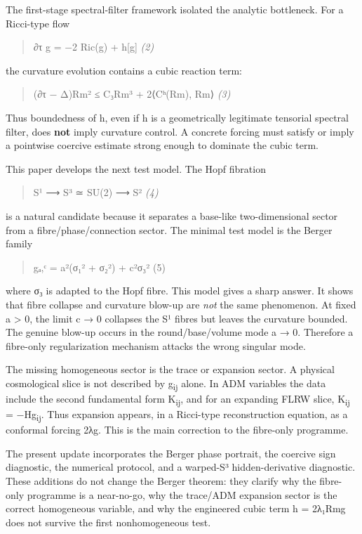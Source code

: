 \documentclass[
]{article}
\begin{document}
The first-stage spectral-filter framework isolated the analytic bottleneck. For a Ricci-type flow

\begin{quote}
∂τ g = −2 Ric(g) + h{[}g{]} \emph{(2)}
\end{quote}

the curvature evolution contains a cubic reaction term:

\begin{quote}
(∂τ − Δ)\textbar Rm\textbar² ≤ C₃\textbar Rm\textbar³ + 2⟨Cʰ(Rm), Rm⟩ \emph{(3)}
\end{quote}

Thus boundedness of h, even if h is a geometrically legitimate tensorial spectral filter, does \textbf{not} imply curvature control. A concrete forcing must satisfy or imply a pointwise coercive estimate strong enough to dominate the cubic term.

This paper develops the next test model. The Hopf fibration

\begin{quote}
S¹ ⟶ S³ ≃ SU(2) ⟶ S² \emph{(4)}
\end{quote}

is a natural candidate because it separates a base-like two-dimensional sector from a fibre/phase/connection sector. The minimal test model is the Berger family

\begin{quote}
gₐ,ᶜ = a²(σ₁² + σ₂²) + c²σ₃² (5)
\end{quote}

where σ₃ is adapted to the Hopf fibre. This model gives a sharp answer. It shows that fibre collapse and curvature blow-up are \emph{not} the same phenomenon. At fixed a \textgreater{} 0, the limit c → 0 collapses the S¹ fibres but leaves the curvature bounded. The genuine blow-up occurs in the round/base/volume mode a → 0. Therefore a fibre-only regularization mechanism attacks the wrong singular mode.

The missing homogeneous sector is the trace or expansion sector. A physical cosmological slice is not described by g\textsubscript{ij} alone. In ADM variables the data include the second fundamental form K\textsubscript{ij}, and for an expanding FLRW slice, K\textsubscript{ij} = −Hg\textsubscript{ij}. Thus expansion appears, in a Ricci-type reconstruction equation, as a conformal forcing 2λg. This is the main correction to the fibre-only programme.

The present update incorporates the Berger phase portrait, the coercive sign diagnostic, the numerical protocol, and a warped-S³ hidden-derivative diagnostic. These additions do not change the Berger theorem: they clarify why the fibre-only programme is a near-no-go, why the trace/ADM expansion sector is the correct homogeneous variable, and why the engineered cubic term h = 2λ₁\textbar Rm\textbar g does not survive the first nonhomogeneous test.
\end{document}
